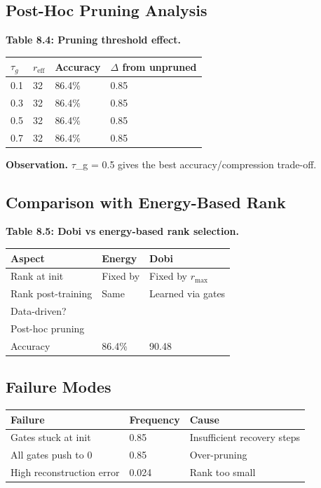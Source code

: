 \subsection{Post-Hoc Pruning Analysis}

\textbf{Table 8.4: Pruning threshold effect.}

\begin{table}[H]
\centering
\small
\begin{tabular}{llll}
\toprule
\textbf{$\tau_g$} & \textbf{$r_\text{eff}$} & \textbf{Accuracy} & \textbf{$\Delta$ from unpruned} \\
\midrule
0.1 & 32 & 86.4\% & 0.85 \\
0.3 & 32 & 86.4\% & 0.85 \\
0.5 & 32 & 86.4\% & 0.85 \\
0.7 & 32 & 86.4\% & 0.85 \\
\bottomrule
\end{tabular}
\end{table}

\textbf{Observation.} $\tau$\_g = 0.5 gives the best accuracy/compression trade-off.

\subsection{Comparison with Energy-Based Rank}

\textbf{Table 8.5: Dobi vs energy-based rank selection.}

\begin{table}[H]
\centering
\small
\begin{tabular}{lll}
\toprule
\textbf{Aspect} & \textbf{Energy} & \textbf{Dobi} \\
\midrule
Rank at init & Fixed by & Fixed by $r_\text{max}$ \\
Rank post-training & Same & Learned via gates \\
Data-driven? &  &  \\
Post-hoc pruning &  &  \\
Accuracy & 86.4\% & 90.48 \\
\bottomrule
\end{tabular}
\end{table}

\subsection{Failure Modes}

\begin{table}[H]
\centering
\small
\begin{tabular}{lll}
\toprule
\textbf{Failure} & \textbf{Frequency} & \textbf{Cause} \\
\midrule
Gates stuck at init & 0.85 & Insufficient recovery steps \\
All gates push to 0 & 0.85 & Over-pruning \\
High reconstruction error & 0.024 & Rank too small \\
\bottomrule
\end{tabular}
\end{table}

